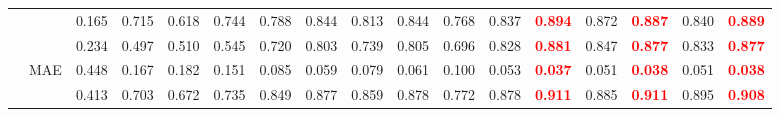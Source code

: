 \documentclass[runningheads]{llncs}
\begin{document}
\begin{table}[t]
{\begin{tabular}{@{}rl|ccccccccccc|cc|cc@{}}
    &             & 0.165                                     & 0.715                                       & 0.618                                       & 0.744                                  & 0.788                                      & 0.844                                          & 0.813                                      & 0.844                                        & 0.768                                            & 0.837                                      & \textcolor{red}{\textbf{0.894}} & 0.872                                          & \textcolor{red}{\textbf{0.887}} & 0.840                                     & \textcolor{red}{\textbf{0.889}} \\
    &  & 0.234                                     & 0.497                                       & 0.510                                       & 0.545                                  & 0.720                                      & 0.803                                          & 0.739                                      & 0.805                                        & 0.696                                            & 0.828                                      & \textcolor{red}{\textbf{0.881}} & 0.847                                          & \textcolor{red}{\textbf{0.877}} & 0.833                                     & \textcolor{red}{\textbf{0.877}} \\
    & MAE                  & 0.448                                     & 0.167                                       & 0.182                                       & 0.151                                  & 0.085                                      & 0.059                                          & 0.079                                      & 0.061                                        & 0.100                                            & 0.053                                      & \textcolor{red}{\textbf{0.037}} & 0.051                                          & \textcolor{red}{\textbf{0.038}} & 0.051                                     & \textcolor{red}{\textbf{0.038}} \\
    &               & 0.413                                     & 0.703                                       & 0.672                                       & 0.735                                  & 0.849                                      & 0.877                                          & 0.859                                      & 0.878                                        & 0.772                                            & 0.878                                      & \textcolor{red}{\textbf{0.911}} & 0.885                                          & \textcolor{red}{\textbf{0.911}} & 0.895                                     & \textcolor{red}{\textbf{0.908}} \\

\end{tabular}}
\end{table}
\end{document}

